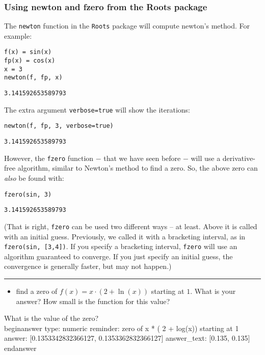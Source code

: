 \documentclass[12pt]{article}
\begin{document}
\subsubsection{Using newton and fzero from the Roots package}\newline
The \texttt{newton} function in the \texttt{Roots} package will compute newton's method. For example:\begin{verbatim}
f(x) = sin(x)
fp(x) = cos(x)
x = 3
newton(f, fp, x)
\end{verbatim}
\begin{verbatim}
3.141592653589793\end{verbatim}
\newline
The extra argument \texttt{verbose=true} will show the iterations:\begin{verbatim}
newton(f, fp, 3, verbose=true)
\end{verbatim}
\begin{verbatim}
3.141592653589793\end{verbatim}
\newline
However, the \texttt{fzero} function $-$ that we have seen before $-$ will use a derivative-free algorithm, similar to Newton's method to find a zero. So, the above zero can \textit{also} be found with:\begin{verbatim}
fzero(sin, 3)
\end{verbatim}
\begin{verbatim}
3.141592653589793\end{verbatim}
\newline
(That is right, \texttt{fzero} can be used two different ways – at least. Above it is called with an initial guess. Previously, we called it with a bracketing interval, as in \texttt{fzero(sin, [3,4])}. If you specify a bracketing interval, \texttt{fzero} will use an algorithm guaranteed to converge. If you just specify an initial guess, the convergence is generally faster, but may not happen.)\rule{\textwidth}{1pt}
\begin{itemize}\item find a zero of $f(x) = x\cdot (2+\ln(x))$ starting at $1$. What is   your answer? How small is the function for this value?\end{itemize}\newline
What is the value of the zero?
\\begin{answer}
    type: numeric
    reminder: zero of x * ( 2 + log(x)) starting at 1
    answer: [0.1353342832366127, 0.1353362832366127]
    answer_text: [0.135, 0.135] 
\\end{answer}
\end{document}
